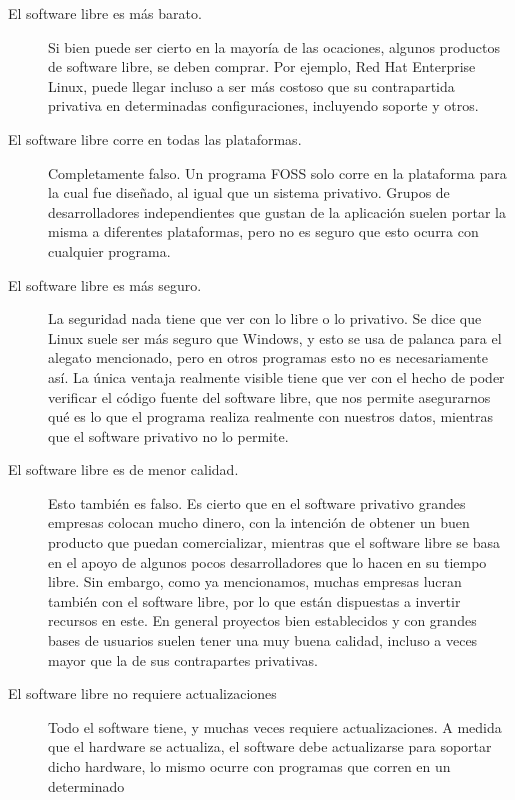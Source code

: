 \begin{description}
    \item[El software libre es más barato.]
        Si bien puede ser cierto en la mayoría de las ocaciones, algunos
        productos de software libre, se deben comprar. Por ejemplo, Red Hat
        Enterprise Linux, puede llegar incluso a ser más costoso que su
        contrapartida privativa en determinadas configuraciones, incluyendo
        soporte y otros.
    \item[El software libre corre en todas las plataformas.]
        Completamente falso. Un programa FOSS solo corre en la plataforma para
        la cual fue diseñado, al igual que un sistema privativo. Grupos de
        desarrolladores independientes que gustan de la aplicación suelen
        portar la misma a diferentes plataformas, pero no es seguro que esto
        ocurra con cualquier programa.
    \item[El software libre es más seguro.]
        La seguridad nada tiene que ver con lo libre o lo privativo. Se dice
        que Linux suele ser más seguro que Windows, y esto se usa de palanca
        para el alegato mencionado, pero en otros programas esto no es
        necesariamente así. La única ventaja realmente visible tiene que ver
        con el hecho de poder verificar el código fuente del software libre,
        que nos permite asegurarnos qué es lo que el programa realiza realmente
        con nuestros datos, mientras que el software privativo no lo permite.
    \item[El software libre es de menor calidad.]
        Esto también es falso. Es cierto que en el software privativo grandes
        empresas colocan mucho dinero, con la intención de obtener un buen
        producto que puedan comercializar, mientras que el software libre se
        basa en el apoyo de algunos pocos desarrolladores que lo hacen en su
        tiempo libre. Sin embargo, como ya mencionamos, muchas empresas lucran
        también con el software libre, por lo que están dispuestas a invertir 
        recursos en este. En general proyectos bien establecidos y con grandes
        bases de usuarios suelen tener una muy buena calidad, incluso a veces
        mayor que la de sus contrapartes privativas.
    \item[El software libre no requiere actualizaciones]
        Todo el software tiene, y muchas veces requiere actualizaciones. A medida
        que el hardware se actualiza, el software debe actualizarse para soportar
        dicho hardware, lo mismo ocurre con programas que corren en un determinado

\end{description}
